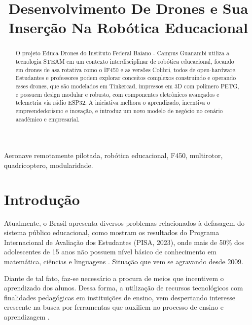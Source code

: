 \documentclass[conference]{IEEEtran}
\begin{document}
\title{Desenvolvimento De Drones e Sua Inserção Na Robótica Educacional}


\maketitle

\begin{abstract}
O projeto Educa Drones do Instituto Federal Baiano - Campus Guanambi utiliza a tecnologia STEAM em um contexto interdisciplinar de robótica educacional, focando em drones de asa rotativa como o IF450 e as versões Colibri, todos de open-hardware. Estudantes e professores podem explorar conceitos complexos construindo e operando esses drones, que são modelados em Tinkercad, impressos em 3D com polímero PETG, e possuem design modular e robusto, com componentes eletrônicos avançados e telemetria via rádio ESP32. A iniciativa melhora o aprendizado, incentiva o empreendedorismo e inovação, e introduz um novo modelo de negócio no cenário acadêmico e empresarial.
\end{abstract}

\begin{IEEEkeywords}
Aeronave remotamente pilotada, robótica educacional, F450, multirotor, quadricoptero, modularidade.
\end{IEEEkeywords}

\section{Introdução}

Atualmente, o Brasil apresenta diversos problemas relacionados à defasagem do sistema público educacional, como mostram os resultados do Programa Internacional de Avaliação dos Estudantes (PISA, 2023), onde mais de 50\% dos adolescentes de 15 anos não possuem nível básico de conhecimento em matemática, ciências e linguagens \cite{b6}. Situação que vem se agravando desde 2009.

Diante de tal fato, faz-se necessário a procura de meios que incentivem o aprendizado dos alunos. Dessa forma, a utilização de recursos tecnológicos com finalidades pedagógicas em instituições de ensino, vem despertando interesse crescente na busca por ferramentas que auxiliem no processo de ensino e aprendizagem \cite{b12}.
\end{document}
